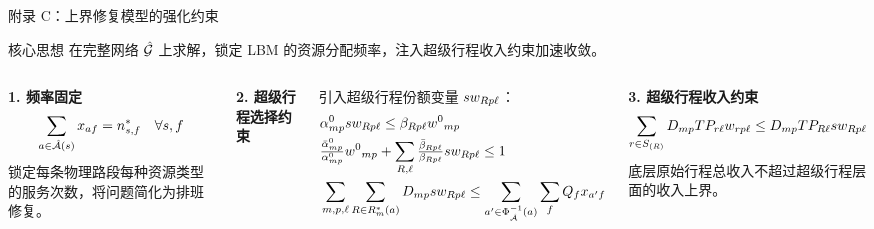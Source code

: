 \begin{frame}{附录 C：上界修复模型的强化约束}
\scriptsize
\begin{block}{核心思想}
在完整网络 $\full{\net}$ 上求解，锁定 LBM 的资源分配频率，注入超级行程收入约束加速收敛。
\end{block}
\vspace{0.1cm}
\begin{columns}[T,totalwidth=\textwidth]
\textbf{1. 频率固定}
\vspace{-0.1cm}
\begin{equation*}
\sum_{a\in\full{\segArcSet{s}}}\fleetAssignVar_{af} = \freq_{s,f}^{*} \quad \forall s,f
\end{equation*}
锁定每条物理路段每种资源类型的服务次数，将问题简化为排班修复。

\textbf{2. 超级行程选择约束}

引入超级行程份额变量 $sw_{Rp\ell}$：
\vspace{-0.1cm}
\begin{align*}
& \alpha^0_{mp}sw_{Rp\ell} \le \beta_{Rp\ell}{w^0}_{mp} \\
& \tfrac{\bar{\alpha}^0_{mp}}{\alpha^0_{mp}}{w^0}_{mp} + \sum_{R,\ell}\tfrac{\bar{\beta}_{Rp\ell}}{\beta_{Rp\ell}}sw_{Rp\ell} \le 1 \\
& \sum_{m,p,\ell}\sum_{R\in R^{*}_{m}(a)}D_{mp}sw_{Rp\ell} \le \sum_{a'\in\Phi_{\hat{\mathcal{A}}}^{-1}(a)}\sum_fQ_fx_{a'f}
\end{align*}

\vspace{0.1cm}
\textbf{3. 超级行程收入约束}
\vspace{-0.1cm}
\begin{equation*}
\sum_{r\in S_{(R)}}D_{mp}TP_{r\ell}w_{rp\ell} \le D_{mp}TP_{R\ell}sw_{Rp\ell}
\end{equation*}
底层原始行程总收入不超过超级行程层面的收入上界。
\end{columns}
\end{frame}


